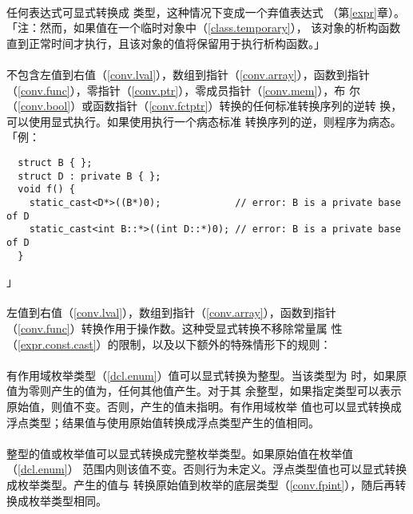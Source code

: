 \paragraph{}
任何表达式可显式转换成 类型，这种情况下变成一个弃值表达式
（第\ref{expr}章）。「注：然而，如果值在一个临时对象中（\ref{class.temporary}），
该对象的析构函数直到正常时间才执行，且该对象的值将保留用于执行析构函数。」

\paragraph{}
不包含左值到右值（\ref{conv.lval}），数组到指针（\ref{conv.array}），函数到指针
（\ref{conv.func}），零指针（\ref{conv.ptr}），零成员指针（\ref{conv.mem}），布
尔（\ref{conv.bool}）或函数指针（\ref{conv.fctptr}）转换的任何标准转换序列的逆转
换，可以使用显式执行。如果使用执行一个病态标准
转换序列的逆，则程序为病态。「例：
\begin{lstlisting}
  struct B { };
  struct D : private B { };
  void f() {
    static_cast<D*>((B*)0);             // error: B is a private base of D
    static_cast<int B::*>((int D::*)0); // error: B is a private base of D
  }
\end{lstlisting}」

\paragraph{}
左值到右值（\ref{conv.lval}），数组到指针（\ref{conv.array}），函数到指针
（\ref{conv.func}）转换作用于操作数。这种受显式转换不移除常量属
性（\ref{expr.const.cast}）的限制，以及以下额外的特殊情形下的规则：

\paragraph{}
有作用域枚举类型（\ref{dcl.enum}）值可以显式转换为整型。当该类型为
时，如果原值为零则产生的值为，任何其他值产生。对于其
余整型，如果指定类型可以表示原始值，则值不变。否则，产生的值未指明。有作用域枚举
值也可以显式转换成浮点类型；结果值与使用原始值转换成浮点类型产生的值相同。

\paragraph{}
整型的值或枚举值可以显式转换成完整枚举类型。如果原始值在枚举值（\ref{dcl.enum}）
范围内则该值不变。否则行为未定义。浮点类型值也可以显式转换成枚举类型。产生的值与
转换原始值到枚举的底层类型（\ref{conv.fpint}），随后再转换成枚举类型相同。

